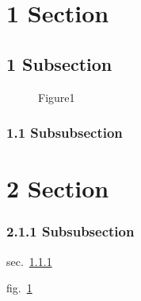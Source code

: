 \section{1 Section}\label{sec:section}

\subsection{1 Subsection}\label{sec:subsection}

\begin{figure}
\centering
{}
\caption{Figure1}\label{fig:figure1}
\end{figure}

\subsubsection{1.1 Subsubsection}\label{sec:subsubsection}

\section{2 Section}\label{sec:section-1}

\subsubsection{2.1.1 Subsubsection}\label{sec:subsubsection-1}

sec.~\ref{sec:subsubsection}

fig.~\ref{fig:figure1}
